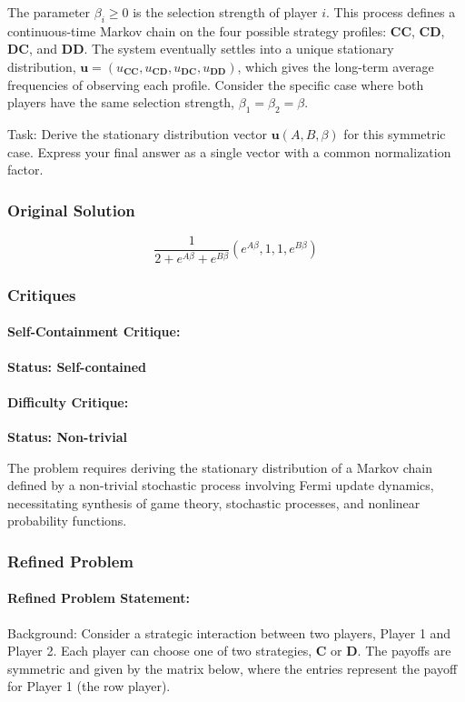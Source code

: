 \documentclass[10pt]{article}
\begin{document}
The parameter $\beta_i \ge 0$ is the selection strength of player $i$. This process defines a continuous-time Markov chain on the four possible strategy profiles: $\mathbf{CC}$, $\mathbf{CD}$, $\mathbf{DC}$, and $\mathbf{DD}$. The system eventually settles into a unique stationary distribution, $\mathbf{u} = (u_{\mathbf{CC}}, u_{\mathbf{CD}}, u_{\mathbf{DC}}, u_{\mathbf{DD}})$, which gives the long-term average frequencies of observing each profile. Consider the specific case where both players have the same selection strength, $\beta_1 = \beta_2 = \beta$.

Task:
Derive the stationary distribution vector $\mathbf{u}(A, B, \beta)$ for this symmetric case. Express your final answer as a single vector with a common normalization factor.

\subsubsection*{Original Solution}
\[ \frac{1}{2 + e^{A \beta} + e^{B \beta}}(e^{A \beta},1,1,e^{B \beta}) \]

\subsubsection*{Critiques}
\paragraph*{Self-Containment Critique:}
\textcolor{pass}{\textbf{Status: Self-contained}}




\paragraph*{Difficulty Critique:}
\textcolor{pass}{\textbf{Status: Non-trivial}}

The problem requires deriving the stationary distribution of a Markov chain defined by a non-trivial stochastic process involving Fermi update dynamics, necessitating synthesis of game theory, stochastic processes, and nonlinear probability functions.


\subsubsection*{Refined Problem}
\paragraph*{Refined Problem Statement:}
Background:
Consider a strategic interaction between two players, Player 1 and Player 2. Each player can choose one of two strategies, $\mathbf{C}$ or $\mathbf{D}$. The payoffs are symmetric and given by the matrix below, where the entries represent the payoff for Player 1 (the row player).
\end{document}
